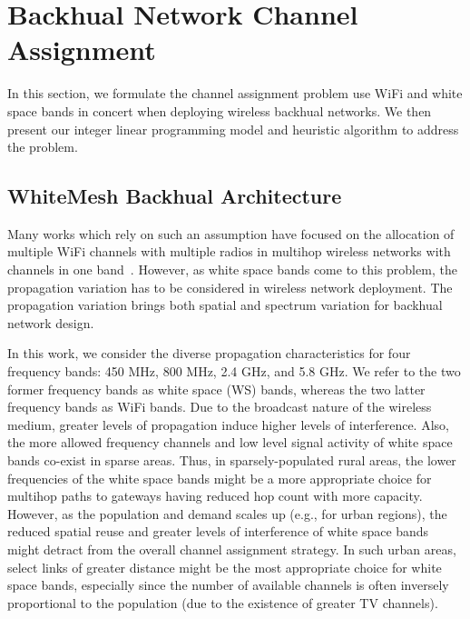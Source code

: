 \section{Backhual Network Channel Assignment}
\label{sec:whitemesh}

In this section, we formulate the channel assignment problem use WiFi and white space bands in concert 
when deploying wireless backhual networks. We then present our integer linear programming model and 
heuristic algorithm to address the problem. 
 
\subsection{WhiteMesh Backhual Architecture}
\label{subsec:architecture}

Many works which rely on such an assumption have focused on the allocation of multiple WiFi channels 
with multiple radios in multihop wireless networks with channels in one band~\cite{doraghinejad2014channel}.
However, as white space bands come to this problem, the propagation variation has to be considered in 
wireless network deployment. The propagation variation brings both spatial and spectrum variation for 
backhual network design.

In this work, we consider the diverse propagation characteristics for four frequency bands: 450 MHz, 800 
MHz, 2.4 GHz, and 5.8 GHz. We refer to the two former frequency bands as white space (WS) bands, whereas
the two latter frequency bands as WiFi bands. Due to the broadcast nature of the wireless medium, 
greater levels of propagation induce higher levels of interference. Also, the more allowed frequency
channels and low level signal activity of white space bands co-exist in sparse areas. Thus, in 
sparsely-populated rural areas, the lower frequencies of the white space bands might be a more appropriate 
choice for multihop paths to gateways having reduced hop count with more capacity. However, as the population 
and demand scales up (e.g., for urban regions), the reduced spatial reuse and greater levels of interference 
of white space bands might detract from the overall channel assignment strategy. In such urban areas, select 
links of greater distance might be the most appropriate choice for white space bands, especially since the 
number of available channels is often inversely proportional to the population (due to the existence of greater 
TV channels).

